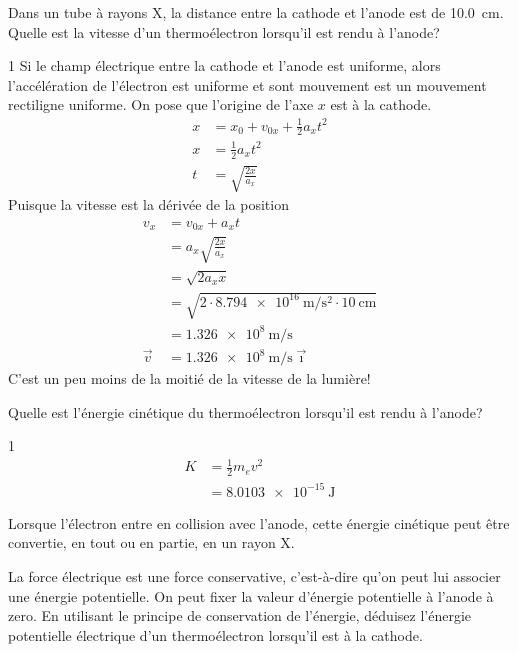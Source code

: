 \documentclass{tufte-handout}
\newcommand{\xhat}{\vec{\imath}}
\newcommand{\vv}{\vec{v}}
\def\reponse{0}
\begin{document}
Dans un tube à rayons X, la distance entre la cathode et l'anode est de
\SI{10.0}{\centi\meter}. Quelle est la vitesse d'un thermoélectron lorsqu'il
est rendu à l'anode?

\if\reponse1
  {\color{tblue}
    Si le champ électrique entre la cathode et l'anode est uniforme, alors
    l'accélération de l'électron est uniforme et sont mouvement est un
    mouvement rectiligne uniforme. On pose que l'origine de l'axe $x$ est à la
    cathode.
    \begin{align*}
      x &= x_0 + v_{0x} + \frac{1}{2} a_x t^2  \\
      x &= \frac{1}{2} a_x t^2    \\
      t &= \sqrt{\frac{2x}{a_x}}
    \end{align*}
    Puisque la vitesse est la dérivée de la position
    \begin{align*}
      v_x &= v_{0x} + a_x t  \\
          &= a_x \sqrt{\frac{2x}{a_x}}  \\
          &= \sqrt{2a_xx}  \\
          &= \sqrt{2 \cdot \SI{8.794e16}{\meter\per\second\squared} \cdot
                     \SI{10}{\centi\meter}}  \\
          &= \SI{1.326e8}{\meter\per\second}  \\
      \vv &= \SI{1.326e8}{\meter\per\second} \xhat
    \end{align*}
    C'est un peu moins de la moitié de la vitesse de la lumière!
  }
\else
  \vspace{10cm}
\fi


Quelle est l'énergie cinétique du thermoélectron lorsqu'il est rendu à l'anode?

\if\reponse1
  {\color{tblue}
    \begin{align*}
      K &= \frac{1}{2} m_e v^2  \\
        &= \SI{8.0103e-15}{\joule}
    \end{align*}
  }
\else
  \vspace{5cm}
\fi

Lorsque l'électron entre en collision avec l'anode, cette énergie cinétique
peut être convertie, en tout ou en partie, en un rayon X.

La force électrique est une force conservative, c'est-à-dire qu'on peut lui
associer une énergie potentielle. On peut fixer la valeur d'énergie potentielle
à l'anode à zero. En utilisant le principe de conservation de l'énergie,
déduisez l'énergie potentielle électrique d'un thermoélectron lorsqu'il est à
la cathode.
\end{document}
